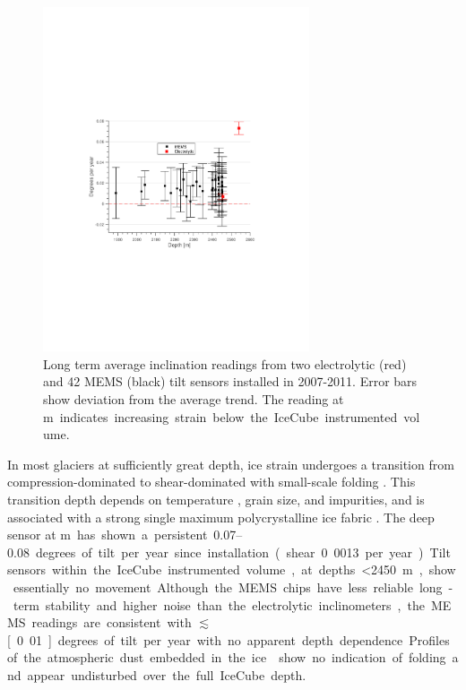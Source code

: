 \begin{figure}[!h]
 \centering
\includegraphics[width=0.7\textwidth]{graphics/dom/tilt.pdf}
\caption{Long term average inclination readings from two electrolytic (red) and 42 MEMS (black) tilt sensors installed in 2007-2011.  Error bars show deviation from the average trend.  The reading at \unit[2540]m indicates increasing strain below the IceCube instrumented volume.}
\label{fig:tilt}
\end{figure}


In most glaciers at sufficiently great depth, ice strain undergoes a transition from compression-dominated to shear-dominated with small-scale folding \cite{montagnat14,jansen16}.  This transition depth depends on temperature \cite{price2002temperature}, grain size, and impurities, and is associated with a strong single maximum polycrystalline ice fabric \cite{cuffey10}.  The deep sensor at \unit[2540]m has shown a persistent \numrange[range-phrase = --]{0.07}{0.08} degrees of tilt per year since installation (shear 0.0013 per year).  Tilt sensors within the IceCube instrumented volume, at depths \SI{<2450}m,  show essentially no movement.  Although the MEMS chips have less reliable long-term stability and higher noise than the electrolytic inclinometers, the MEMS readings are consistent with $\lesssim$\unit[0.01]degrees of tilt per year with no apparent depth dependence.  Profiles of the atmospheric dust embedded in the ice \cite{I3:dustlogger} show no indication of folding and appear undisturbed over the full IceCube depth.
  

